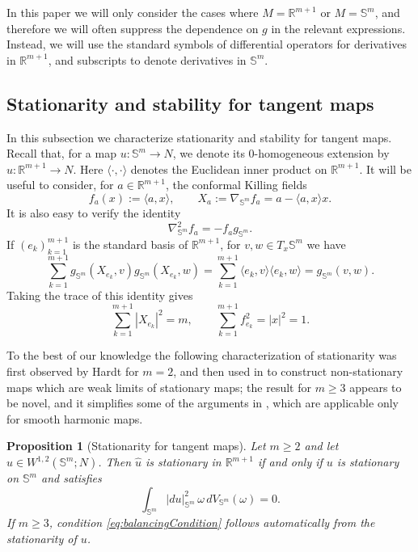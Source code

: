 \documentclass[11pt]{article}
\theoremstyle{plain}
\numberwithin{equation}{section}
\newtheorem{proposition}[theorem]{Proposition}
\theoremstyle{definition}
\def \R {\mathbb{R}}
\def \mb{\mathbb}
\begin{document}
In this paper we will only consider the cases where $M=\R^{m+1}$ or $M=\mb S^{m}$, and therefore we will often suppress the dependence on $g$ in the relevant expressions. Instead, we will use the standard symbols of differential operators for derivatives in $\R^{m+1}$, and subscripts to denote derivatives in $\mb S^m$.

\subsection{Stationarity and stability for tangent maps}

In this subsection we characterize stationarity and stability for tangent maps.  Recall that, for a map $u\colon \mb S^{m}\to N$, we denote its
0-homogeneous extension by $\hat u\colon \R^{m+1}\to N$. Here
$\langle\cdot,\cdot\rangle$ denotes the Euclidean inner product on
$\R^{m+1}$. It will be useful to consider, for $a\in\R^{m+1}$, the
conformal Killing fields
\begin{equation}
\label{eq:conf_killing}
f_a(x):=\langle a,x\rangle,
\qquad
X_a:=\nabla_{\mb S^m}f_a= a-\langle a,x\rangle x.
\end{equation}
It is also easy to verify the identity
\begin{equation}
\label{eq:hessianfa}
\nabla_{\mb S^m}^2f_a=-f_ag_{\mb S^m}.
\end{equation}
If $(e_k)_{k=1}^{m+1}$ is the standard basis of $\R^{m+1}$, for 
$v,w\in T_x\mb S^m$ we have
\begin{equation}
    \label{eq:ParsevalConformalFields}
    \sum_{k=1}^{m+1}
      g_{\mb S^m}(X_{e_k},v)g_{\mb S^m}(X_{e_k},w)
    =\sum_{k=1}^{m+1}\langle e_k,v\rangle\langle e_k,w\rangle
    =g_{\mb S^m}(v,w).
\end{equation}
Taking the trace of this identity gives
\begin{equation}
    \label{eq:ConformalFieldSums}
    \sum_{k=1}^{m+1}|X_{e_k}|^2=m,
    \qquad
    \sum_{k=1}^{m+1}f_{e_k}^2=|x|^2 = 1.
\end{equation}

To the best of our knowledge the following characterization of stationarity was first observed by Hardt for $m=2$, and then used in \cite{Ding2003} to construct non-stationary maps which are weak limits of stationary maps; the result for $m\geq 3$ appears to be novel, and it simplifies some of the arguments in \cite{ElSoufi1995,Struwe2020}, which are applicable only for smooth harmonic maps.

\begin{proposition}[Stationarity for tangent maps]
\label{prop:stationarityHomogeneous}
Let $m\geq2$ and let $u\in W^{1,2}(\mb S^m;N)$.   Then $\hat u$ is stationary in
$\R^{m+1}$ if and only if $u$ is stationary on $\mb S^m$ and satisfies
\begin{equation}
    \label{eq:balancingCondition}
    \int_{\mb S^m}|du|_{\mb S^m}^2\,\omega\,dV_{\mb S^m}(\omega)=0.
\end{equation}
If $m\geq3$, condition \eqref{eq:balancingCondition} follows automatically
from the stationarity of $u$.  
\end{proposition}
\end{document}
